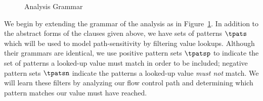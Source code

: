 \documentclass[nocopyright]{sigplanconf}
\begin{document}
\begin{figure}
    \begin{grammar}
    \end{grammar}
    \caption{Analysis Grammar}
    \label{fig_analysisGrammar}
\end{figure}

We begin by extending the grammar of the analysis as in Figure~\ref{fig_analysisGrammar}.  In addition to the abstract forms of the clauses given above, we have sets of patterns $\tpats$ which will be used to model path-sensitivity by filtering value lookups.  Although their grammars are identical, we use positive pattern sets $\tpatsp$ to indicate the set of patterns a looked-up value must match in order to be included; negative pattern sets $\tpatsn$ indicate the patterns a looked-up value \emph{must not} match.  We will learn these filters by analyzing our flow control path and determining which pattern matches our value must have reached.
\end{document}
